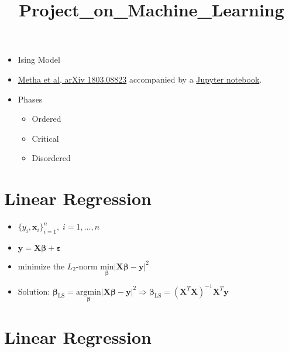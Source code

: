 \documentclass[11pt]{article}
\title{Project\_on\_Machine\_Learning}
\begin{document}
    
\maketitle
    
\begin{itemize}
    \item Ising Model
    \item \href{https://arxiv.org/pdf/1803.08823.pdf}{Metha et al, arXiv
        1803.08823} accompanied by a
        \href{https://physics.bu.edu/~pankajm/MLnotebooks.html}{Jupyter
        notebook}.
    \item Phases
        \begin{itemize}
            \item Ordered
            \item Critical
            \item Disordered
        \end{itemize}
\end{itemize}

\newpage
\hypertarget{linear-regression}{%
\section*{Linear Regression}\label{linear-regression}}

\begin{itemize}
    \item $\{y_i, \boldsymbol{x}_i\}_{i=1}^n,\; i=1,\dots,n$
    \item $\boldsymbol{y} = \boldsymbol{X}\boldsymbol{\beta} + \boldsymbol{\varepsilon}$
    \item minimize the \(L_2\)-norm $\underset{\boldsymbol{\beta}}{\text{min}}{\big|}\boldsymbol{X}\boldsymbol{\beta} - \boldsymbol{y}{\big|}^2$
    \item Solution: $\boldsymbol{\beta}_{\text{LS}} = \underset{\boldsymbol{\beta}}{\text{arg}\text{min}}{\big|}\boldsymbol{X}\boldsymbol{\beta} - \boldsymbol{y}{\big|}^2 \Rightarrow \boldsymbol{\beta}_{\text{LS}} = \left(\boldsymbol{X}^T\boldsymbol{X}\right)^{-1}\boldsymbol{X}^T\boldsymbol{y}$
\end{itemize}

\newpage
\hypertarget{linear-regression}{%
\section*{Linear Regression}\label{linear-regression}}
\end{document}
